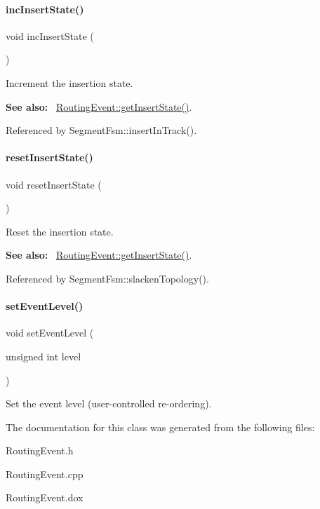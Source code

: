 \paragraph{\texorpdfstring{inc\+Insert\+State()}{incInsertState()}}
{\footnotesize\ttfamily void inc\+Insert\+State (\begin{DoxyParamCaption}{ }\end{DoxyParamCaption})\hspace{0.3cm}{\ttfamily [inline]}}

Increment the insertion state.

{\bfseries See also\+:}~ \hyperlink{classKite_1_1RoutingEvent_a00f02910915e7deb857f023e5d584c08}{Routing\+Event\+::get\+Insert\+State()}. 

Referenced by Segment\+Fsm\+::insert\+In\+Track().

\mbox{\label{classKite_1_1RoutingEvent_ae35f271a106f6c6a6039e4a6f8bf4009}} 
\paragraph{\texorpdfstring{reset\+Insert\+State()}{resetInsertState()}}
{\footnotesize\ttfamily void reset\+Insert\+State (\begin{DoxyParamCaption}{ }\end{DoxyParamCaption})\hspace{0.3cm}{\ttfamily [inline]}}

Reset the insertion state.

{\bfseries See also\+:}~ \hyperlink{classKite_1_1RoutingEvent_a00f02910915e7deb857f023e5d584c08}{Routing\+Event\+::get\+Insert\+State()}. 

Referenced by Segment\+Fsm\+::slacken\+Topology().

\mbox{\label{classKite_1_1RoutingEvent_a70a9ecd62b806eff001aa602132cc630}} 
\paragraph{\texorpdfstring{set\+Event\+Level()}{setEventLevel()}}
{\footnotesize\ttfamily void set\+Event\+Level (\begin{DoxyParamCaption}\item[{unsigned int}]{level }\end{DoxyParamCaption})\hspace{0.3cm}{\ttfamily [inline]}}

Set the event level (user-\/controlled re-\/ordering). 

The documentation for this class was generated from the following files\+:\begin{DoxyCompactItemize}
\item 
Routing\+Event.\+h\item 
Routing\+Event.\+cpp\item 
Routing\+Event.\+dox\end{DoxyCompactItemize}
